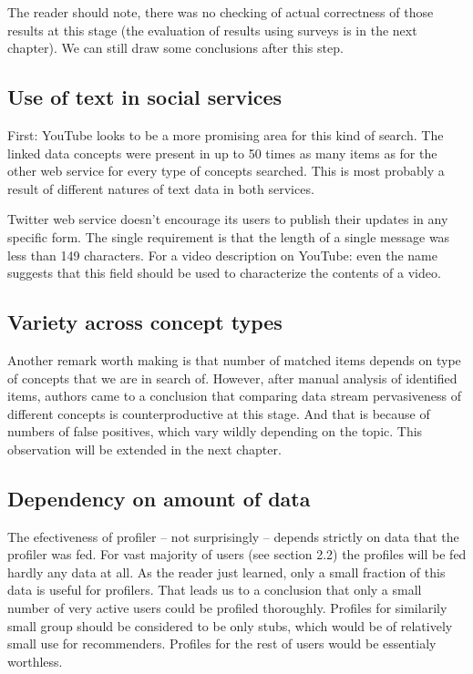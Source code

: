 The reader should note, there was no checking of actual correctness of those results at
this stage (the evaluation of results using surveys is in the next chapter). We
can still draw some conclusions after this step.

\subsection{Use of text in social services}
First: YouTube looks to be a more promising area for this kind of search. The
linked data concepts were present in up to 50 times as many items as for the other
web service for every type of concepts searched. This is most probably a
result of different natures of text data in both services.  

Twitter web service doesn't encourage its users to publish their updates in any
specific form. The single requirement is that the length of a single message
was less than 149 characters. For a video description on YouTube: even the name
suggests that this field should be used to characterize the contents
of a video.

\subsection{Variety across concept types}
Another remark worth making is that number of matched items depends on type of
concepts that we are in search of. However, after manual analysis of identified
items, authors came to a conclusion that comparing data stream pervasiveness of
different concepts is counterproductive at this stage. And that is because of
numbers of false positives, which vary wildly depending on the topic. This
observation will be extended in the next chapter.

\subsection{Dependency on amount of data}
The efectiveness of profiler -- not surprisingly -- depends strictly on data
that the profiler was fed. For vast majority of users (see section 2.2) the
profiles will be fed hardly any data at all. As the reader just learned, only a
small fraction of this data is useful for profilers. That leads us to a
conclusion that only a small number of very active users could be profiled
thoroughly. Profiles for similarily small group should be considered to be only
stubs, which would be of relatively small use for recommenders. Profiles for the
rest of users would be essentialy worthless.
